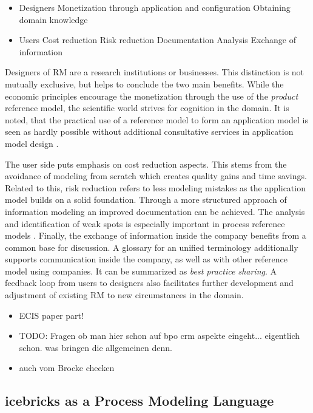 		\begin{itemize}
			\item Designers
			\subitem Monetization through application and configuration
			\subitem Obtaining domain knowledge
			\item Users
			\subitem Cost reduction
			\subitem Risk reduction
			\subitem Documentation
			\subitem Analysis
			\subitem Exchange of information  
		\end{itemize} 
	
		Designers of \acrshort{RM} are a research institutions or businesses. This distinction is not mutually exclusive,  but helps to conclude the two main benefits. While the economic principles encourage the monetization through the use of the \textit{product} reference model, the scientific world strives for cognition in the domain. It is noted, that the practical use of a reference model to form an application model is seen as hardly possible without additional consultative services in application model design \cite{Schutte1998}.
	
		The user side puts emphasis on cost reduction aspects. This stems from the avoidance of modeling from scratch which creates quality gains and time savings. Related to this, risk reduction refers to less modeling mistakes as the application model builds on a solid foundation. Through a more structured approach of information modeling an improved documentation can be achieved. The analysis and identification of weak spots is especially important in process reference models \citep[]{becker2004handelsinformationssysteme}. Finally, the exchange of information inside the company benefits from a common base for discussion. A glossary for an unified terminology additionally supports communication inside the company, as well as with other reference model using companies. It can be summarized as \textit{best practice sharing}. A feedback loop from users to designers also facilitates further development and adjustment of existing \acrshort{RM} to new circumstances in the domain. 
		
		\begin{itemize}
			\item  ECIS paper part!
			\item TODO: Fragen ob man hier schon auf bpo crm aspekte eingeht... eigentlich schon. was bringen die allgemeinen denn. 
			\item auch vom Brocke checken 
		\end{itemize}
		\subsection{icebricks as a Process Modeling Language}
		

